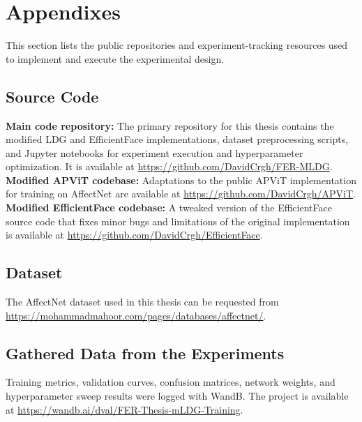
\chapter{Appendixes}
\label{chapter:appendixes}

\newpage

This section lists the public repositories and experiment-tracking resources used to implement and execute the experimental design.\\

\section{Source Code}
\label{deliverable:source-code}

\textbf{Main code repository:} The primary repository for this thesis contains the modified LDG and EfficientFace implementations, dataset preprocessing scripts, and Jupyter notebooks for experiment execution and hyperparameter optimization. It is available at \url{https://github.com/DavidCrgh/FER-MLDG}.\\

\textbf{Modified APViT codebase:} Adaptations to the public APViT \cite{apvit2023} implementation for training on AffectNet are available at \url{https://github.com/DavidCrgh/APViT}.\\

\textbf{Modified EfficientFace codebase:} A tweaked version of the EfficientFace \cite{eff-face2021} source code that fixes minor bugs and limitations of the original implementation is available at \url{https://github.com/DavidCrgh/EfficientFace}.\\

\section{Dataset}
\label{deliverable:dataset}

The AffectNet dataset \cite{affnet2019} used in this thesis can be requested from \url{https://mohammadmahoor.com/pages/databases/affectnet/}.

\section{Gathered Data from the Experiments}

Training metrics, validation curves, confusion matrices, network weights, and hyperparameter sweep results were logged with WandB. The project is available at \url{https://wandb.ai/dval/FER-Thesis-mLDG-Training}.